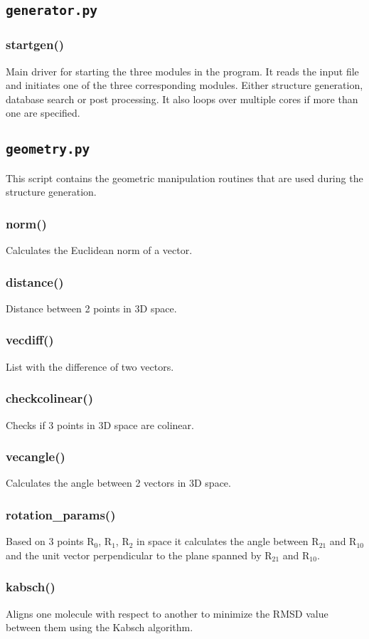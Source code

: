 \documentclass[a4paper,12pt]{assignment}
\begin{document}
\subsection{\texttt{generator.py}}
\subsubsection{startgen()}
Main driver for starting the three modules in the program. It reads the input file and initiates one of the three corresponding modules. Either structure generation, database search or post processing. It also loops over multiple cores if more than one are specified.

\subsection{\texttt{geometry.py}}
This script contains the geometric manipulation routines that are used during the structure generation.
\subsubsection{norm()}
Calculates the Euclidean norm of a vector.
\subsubsection{distance()}
Distance between 2 points in 3D space.
\subsubsection{vecdiff()}
List with the difference of two vectors.
\subsubsection{checkcolinear()}
Checks if 3 points in 3D space are colinear. 
\subsubsection{vecangle()}
Calculates the angle between 2 vectors in 3D space.
\subsubsection{rotation\_params()}
Based on 3 points R$_0$, R$_1$, R$_2$ in space it calculates the angle between R$_{21}$ and R$_{10}$ and the unit vector perpendicular to the plane spanned by R$_{21}$ and R$_{10}$.
\subsubsection{kabsch()}
Aligns one molecule with respect to another to minimize the RMSD value between them using the Kabsch algorithm.
\end{document}
